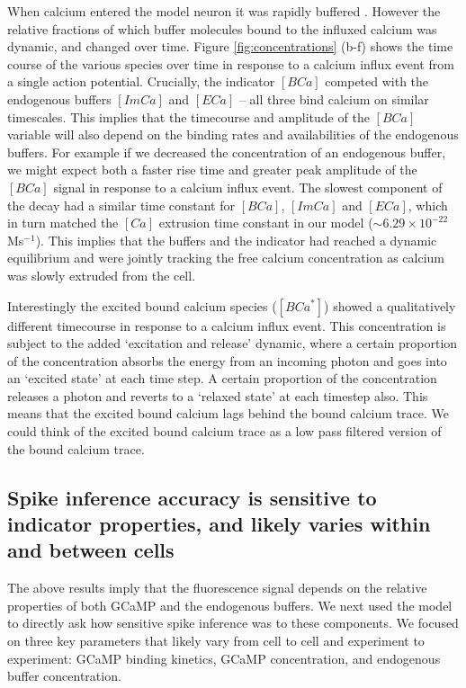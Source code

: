 
When calcium entered the model neuron it was rapidly buffered  \parencite{bartol}. However the relative fractions of which buffer molecules bound to the influxed calcium was dynamic, and changed over time. Figure \ref{fig:concentrations} (b-f) shows the time course of the various species over time in response to a calcium influx event from a single action potential. Crucially, the indicator $[BCa]$ competed with the endogenous buffers $[ImCa]$ and $[ECa]$ – all three bind calcium on similar timescales. This implies that the timecourse and amplitude of the $[BCa]$ variable will also depend on the binding rates and availabilities of the endogenous buffers. For example if we decreased the concentration of an endogenous buffer, we might expect both a faster rise time and greater peak amplitude of the $[BCa]$ signal in response to a calcium influx event. The slowest component of the decay had a similar time constant for $[BCa]$, $[ImCa]$ and $[ECa]$, which in turn matched the $[Ca]$ extrusion time constant in our model ($\sim 6.29 \times 10^{-22}$Ms$^{-1}$). This implies that the buffers and the indicator had reached a dynamic equilibrium and were jointly tracking the free calcium concentration as calcium was slowly extruded from the cell.

Interestingly the excited bound calcium species ($[BCa^*]$) showed a qualitatively different timecourse in response to a calcium influx event. This concentration is subject to the added `excitation and release' dynamic, where a certain proportion of the concentration absorbs the energy from an incoming photon and goes into an `excited state' at each time step. A certain proportion of the concentration releases a photon and reverts to a `relaxed state' at each timestep also. This means that the excited bound calcium lags behind the bound calcium trace. We could think of the excited bound calcium trace as a low pass filtered version of the bound calcium trace.

\subsection{Spike inference accuracy is sensitive to indicator properties, and likely varies within and between cells}
The above results imply that the fluorescence signal depends on the relative properties of both GCaMP and the endogenous buffers. We next used the model to directly ask how sensitive spike inference was to these components. We focused on three key parameters that likely vary from cell to cell and experiment to experiment: GCaMP binding kinetics, GCaMP concentration, and endogenous buffer concentration.

